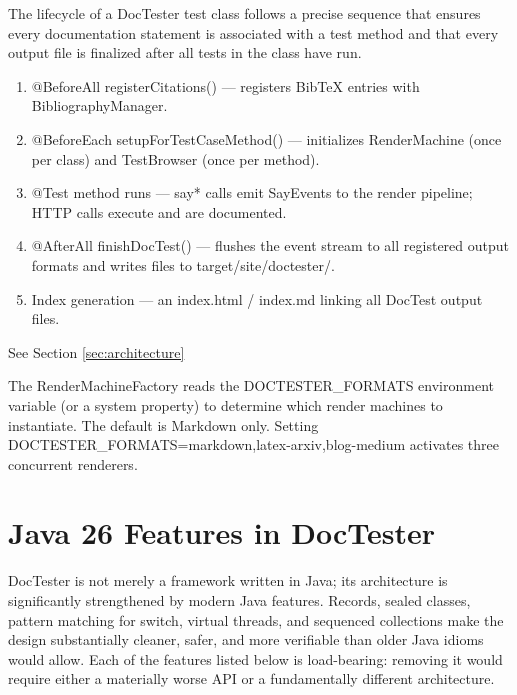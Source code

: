 \documentclass[11pt]{article}
\begin{document}
The lifecycle of a DocTester test class follows a precise sequence that ensures every documentation statement is associated with a test method and that every output file is finalized after all tests in the class have run.

\begin{enumerate}
\item @BeforeAll registerCitations() — registers BibTeX entries with BibliographyManager.
\item @BeforeEach setupForTestCaseMethod() — initializes RenderMachine (once per class) and TestBrowser (once per method).
\item @Test method runs — say* calls emit SayEvents to the render pipeline; HTTP calls execute and are documented.
\item @AfterAll finishDocTest() — flushes the event stream to all registered output formats and writes files to target/site/doctester/.
\item Index generation — an index.html / index.md linking all DocTest output files.
\end{enumerate}


See Section \ref{sec:architecture}

\begin{tcolorbox}[colback=notebg,colframe=blue!50!black,title={\textbf{Note}}]
The RenderMachineFactory reads the DOCTESTER\_FORMATS environment variable (or a system property) to determine which render machines to instantiate. The default is Markdown only. Setting DOCTESTER\_FORMATS=markdown,latex-arxiv,blog-medium activates three concurrent renderers.
\end{tcolorbox}


\section{Java 26 Features in DocTester}

DocTester is not merely a framework written in Java; its architecture is significantly strengthened by modern Java features. Records, sealed classes, pattern matching for switch, virtual threads, and sequenced collections make the design substantially cleaner, safer, and more verifiable than older Java idioms would allow. Each of the features listed below is load-bearing: removing it would require either a materially worse API or a fundamentally different architecture.
\end{document}

